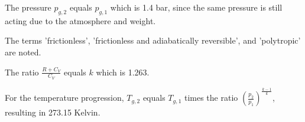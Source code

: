 The pressure \( p_{g,2} \) equals \( p_{g,1} \) which is 1.4 bar, since the same pressure is still acting due to the atmosphere and weight.

The terms 'frictionless', 'frictionless and adiabatically reversible', and 'polytropic' are noted.

The ratio \( \frac{R + C_V}{C_V} \) equals \( k \) which is 1.263.

For the temperature progression, \( T_{g,2} \) equals \( T_{g,1} \) times the ratio \( \left( \frac{p_2}{p_1} \right)^{\frac{k-1}{k}} \), resulting in 273.15 Kelvin.